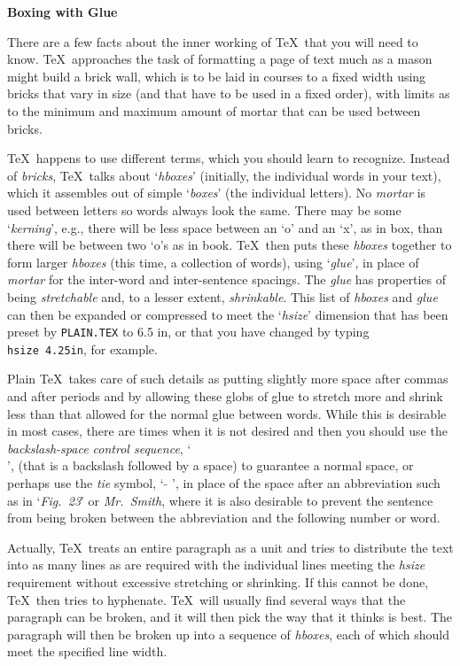 {\bf Boxing with Glue}

There are a few facts about the inner working of \TeX\ that you will
need to know.
\TeX\ approaches the task of formatting a page of text much as a mason
might build a brick wall, which is to be laid in courses to a fixed
width using bricks that vary in size (and that have to be used in a fixed
order), with limits as to the minimum and maximum amount of mortar that
can be used between bricks.

\TeX\ happens to use different terms, which you should learn to recognize.
Instead of {\sl bricks}, \TeX\
talks about `{\sl hboxes\/}' (initially, the individual
words in your text), which it assembles
out of simple `{\sl boxes\/}' (the individual letters). No {\sl mortar}
is used between letters
so words always look the same.
There may be some
`{\sl kerning}', e.g., there will be less space between an `o' and an `x', as in 
box, than
there will be between two `o's as in book.
\TeX\ then puts these {\sl hboxes\/} together to form
larger {\sl hboxes} (this time, a collection of words), using `{\sl glue\/}', in place of
{\sl mortar} for the inter-word and inter-sentence spacings.
The {\sl glue\/} has properties of being {\sl
stretchable} and, to a lesser extent, {\sl shrinkable}.  This list of 
{\sl hboxes\/} and {\sl glue} can then be expanded or compressed to meet
the `{\sl hsize\/}' dimension that has been preset by {\tt PLAIN.TEX} to 6.5 in, or that you
have changed by typing {\tt \\hsize 4.25in}, for example.  

Plain \TeX\ takes care of such details as putting slightly more space after commas
and after periods and by allowing
these globs of glue to stretch more and shrink less than that allowed for
the normal glue between words. While this is desirable in most cases,
there are times when it is not desired and then you should use the {\sl
backslash-space control sequence}, `{\tt \\ }', (that is a backslash
followed by a space) to guarantee a normal
space, or perhaps use the {\sl tie} symbol,
` $\tilde{ }$ ', in place of the space after
an abbreviation such as in `{\sl Fig.~23\/}' or {\sl Mr.~Smith}, where it is
also desirable to prevent the sentence from being broken between the
abbreviation and the following number or word.

Actually, \TeX\ treats an entire paragraph as a unit and tries to distribute the
text into as many lines as are required with the individual lines meeting
the {\sl hsize\/} requirement without excessive stretching or shrinking.
If this cannot be done, \TeX\ then tries to hyphenate. \TeX\
will usually find several ways that the paragraph can be broken, and it
will then pick the way that it thinks is best.
The paragraph will then be broken up into a sequence of {\sl hboxes}, each of which
should meet the specified line width.

